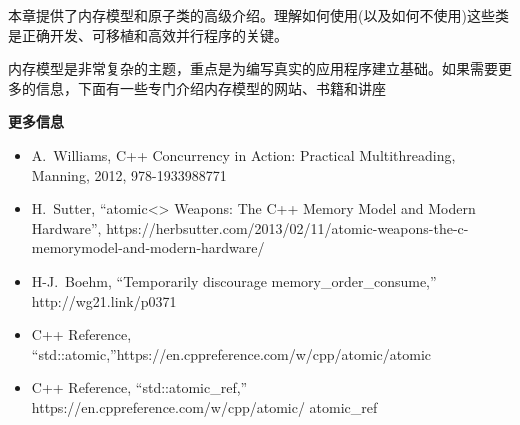 
本章提供了内存模型和原子类的高级介绍。理解如何使用(以及如何不使用)这些类是正确开发、可移植和高效并行程序的关键。\par

内存模型是非常复杂的主题，重点是为编写真实的应用程序建立基础。如果需要更多的信息，下面有一些专门介绍内存模型的网站、书籍和讲座\par

\hspace*{\fill} \par %
\textbf{更多信息}

\begin{itemize}
	\item A. Williams, C++ Concurrency in Action: Practical Multithreading, Manning, 2012, 978-1933988771

	\item H. Sutter, “atomic<> Weapons: The C++ Memory Model and Modern Hardware”, https://herbsutter.com/2013/02/11/atomic-weapons-the-c-memorymodel-and-modern-hardware/
	\item H-J. Boehm, “Temporarily discourage memory\_order\_consume,” http://wg21.link/p0371
	\item C++ Reference,\\ “std::atomic,”https://en.cppreference.com/w/cpp/atomic/atomic
	\item C++ Reference, “std::atomic\_ref,” \\
	https://en.cppreference.com/w/cpp/atomic/
	atomic\_ref
\end{itemize}

\newpage